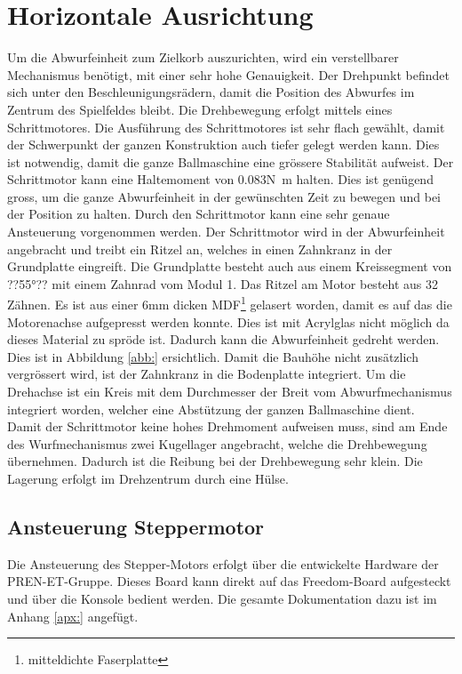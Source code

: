 \section{Horizontale Ausrichtung}
	
    Um die Abwurfeinheit zum Zielkorb auszurichten, wird ein verstellbarer Mechanismus benötigt, 
    mit einer sehr hohe Genauigkeit. Der Drehpunkt befindet sich unter den Beschleunigungsrädern, 
    damit die Position des Abwurfes im Zentrum des Spielfeldes bleibt. Die Drehbewegung erfolgt 
    mittels eines Schrittmotores. Die Ausführung des Schrittmotores ist sehr flach gewählt, damit 
    der Schwerpunkt der ganzen Konstruktion auch tiefer gelegt werden kann. Dies ist notwendig, 
    damit die ganze Ballmaschine eine grössere Stabilität aufweist. Der Schrittmotor kann eine 
    Haltemoment von 0.083\si{\newton\meter} halten. Dies ist genügend gross, um die ganze 
    Abwurfeinheit in der gewünschten Zeit zu bewegen und bei der Position zu halten. Durch den 
    Schrittmotor kann eine sehr genaue Ansteuerung vorgenommen werden. Der Schrittmotor wird in der Abwurfeinheit angebracht und treibt ein Ritzel an, welches in einen Zahnkranz in der Grundplatte 
    eingreift. Die Grundplatte besteht auch aus einem Kreissegment von ??55\si{\degree}?? 
    mit einem Zahnrad vom Modul 1. Das Ritzel am Motor besteht aus 32 Zähnen. Es ist aus einer 
    6\si{\milli\meter} dicken MDF\footnote{mitteldichte Faserplatte} gelasert worden, damit es auf 
    das die Motorenachse aufgepresst werden konnte. Dies ist mit Acrylglas nicht möglich da dieses 
    Material zu spröde ist. Dadurch kann die Abwurfeinheit gedreht werden. Dies ist in Abbildung 
    \ref{abb:} ersichtlich. Damit die Bauhöhe nicht zusätzlich 
    vergrössert wird, ist der Zahnkranz in die Bodenplatte integriert. Um die Drehachse ist ein Kreis 
    mit dem Durchmesser der Breit vom Abwurfmechanismus integriert worden, welcher eine Abstützung 
    der ganzen Ballmaschine dient.\\
    Damit der Schrittmotor keine hohes Drehmoment aufweisen muss, sind am Ende des Wurfmechanismus 
    zwei Kugellager angebracht, welche die Drehbewegung übernehmen. Dadurch ist die Reibung bei der 
    Drehbewegung sehr klein. Die Lagerung erfolgt im Drehzentrum durch eine Hülse.


     \subsection{Ansteuerung Steppermotor}
        Die Ansteuerung des Stepper-Motors erfolgt über die entwickelte Hardware der PREN-ET-Gruppe. 
        Dieses Board kann direkt auf das Freedom-Board aufgesteckt und über die Konsole bedient 
        werden. Die gesamte Dokumentation dazu ist im Anhang \ref{apx:} angefügt. 
        
